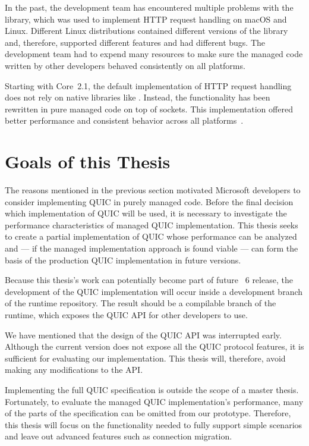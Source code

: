 In the past, the \dotnet{} development team has encountered multiple problems with the
\libcurl~\cite{curlGithub} library, which was used to implement HTTP request handling on macOS and
Linux. Different Linux distributions contained different versions of the \libcurl{} library and,
therefore, supported different features and had different bugs. The \dotnet{} development team had
to expend many resources to make sure the managed code written by other \dotnet{} developers behaved
consistently on all platforms.

Starting with \dotnet{} Core~2.1, the default implementation of HTTP request handling does not rely
on native libraries like \libcurl{}. Instead, the functionality has been rewritten in pure managed
code on top of sockets. This implementation offered better performance and consistent behavior
across all \dotnet{} platforms~\cite{SocketsHttpHandlerDocs}.

\section{Goals of this Thesis}

The reasons mentioned in the previous section motivated Microsoft developers to consider
implementing QUIC in purely managed \csharp{} code. Before the final decision which implementation
of QUIC will be used, it is necessary to investigate the performance characteristics of managed QUIC
implementation. This thesis seeks to create a partial implementation of QUIC whose performance can
be analyzed and --- if the managed implementation approach is found viable --- can form the basis of the
production QUIC implementation in future \dotnet{} versions.

Because this thesis's work can potentially become part of future \dotnet{}~6 release, the
development of the QUIC implementation will occur inside a development branch of the \dotnet{}
runtime repository. The result should be a compilable branch of the runtime, which exposes the QUIC
API for other \dotnet{} developers to use.

We have mentioned that the design of the QUIC API was interrupted early. Although the current
version does not expose all the QUIC protocol features, it is sufficient for evaluating our
implementation. This thesis will, therefore, avoid making any modifications to the API\@.

Implementing the full QUIC specification is outside the scope of a master thesis. Fortunately, to
evaluate the managed QUIC implementation's performance, many of the parts of the specification can
be omitted from our prototype. Therefore, this thesis will focus on the functionality needed to
fully support simple scenarios and leave out advanced features such as connection migration.

